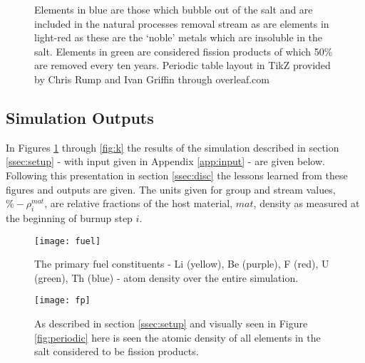 \begin{figure}
\begin{centering}
\end{centering}
\caption{Elements in blue are those which bubble out of the salt and are
included in the natural processes removal stream as are elements in light-red
as these are the `noble' metals which are insoluble in the salt. Elements in
green are considered fission products of which 50\% are removed every ten
years. Periodic table layout in TikZ provided by Chris Rump and Ivan Griffin
through overleaf.com}
\end{figure}

\subsection{Simulation Outputs}\label{ssec:outputs}

In Figures \ref{fig:fuel} through \ref{fig:k} the results of the simulation
described in section \ref{ssec:setup} - with input given in Appendix
\ref{app:input} - are given below. Following this presentation in section
\ref{ssec:disc} the lessons learned from these figures and outputs are
given. The units given for group and stream values, $\%-\rho^{mat}_{i}$, are
relative fractions of the host material, $mat$, density as measured at the 
beginning of burnup step $i$.

\begin{figure}[H]
    \centering
    \texttt{[image: fuel]}
    \caption{The primary fuel constituents - Li (yellow), Be (purple), F (red),
    U (green), Th (blue) - atom density over the entire simulation.}
    \label{fig:fuel}
\end{figure}

\begin{figure}[H]
    \centering
    \texttt{[image: fp]}
    \caption{As described in section \ref{ssec:setup} and visually seen in
    Figure \ref{fig:periodic} here is seen the atomic density of all elements
    in the salt considered to be fission products.}
    \label{fig:fp}
\end{figure}


